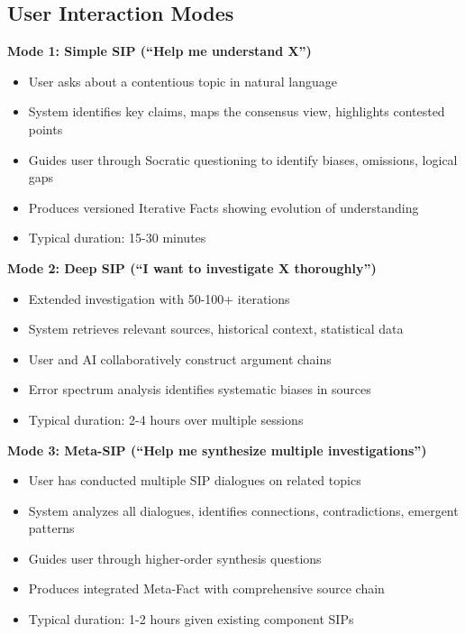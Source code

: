 \documentclass[11pt,a4paper]{article}
\begin{document}
\subsection{User Interaction Modes}

\textbf{Mode 1: Simple SIP (``Help me understand X'')}
\begin{itemize}[nosep]
    \item User asks about a contentious topic in natural language
    \item System identifies key claims, maps the consensus view, highlights contested points
    \item Guides user through Socratic questioning to identify biases, omissions, logical gaps
    \item Produces versioned Iterative Facts showing evolution of understanding
    \item Typical duration: 15-30 minutes
\end{itemize}

\textbf{Mode 2: Deep SIP (``I want to investigate X thoroughly'')}
\begin{itemize}[nosep]
    \item Extended investigation with 50-100+ iterations
    \item System retrieves relevant sources, historical context, statistical data
    \item User and AI collaboratively construct argument chains
    \item Error spectrum analysis identifies systematic biases in sources
    \item Typical duration: 2-4 hours over multiple sessions
\end{itemize}

\textbf{Mode 3: Meta-SIP (``Help me synthesize multiple investigations'')}
\begin{itemize}[nosep]
    \item User has conducted multiple SIP dialogues on related topics
    \item System analyzes all dialogues, identifies connections, contradictions, emergent patterns
    \item Guides user through higher-order synthesis questions
    \item Produces integrated Meta-Fact with comprehensive source chain
    \item Typical duration: 1-2 hours given existing component SIPs
\end{itemize}
\end{document}
